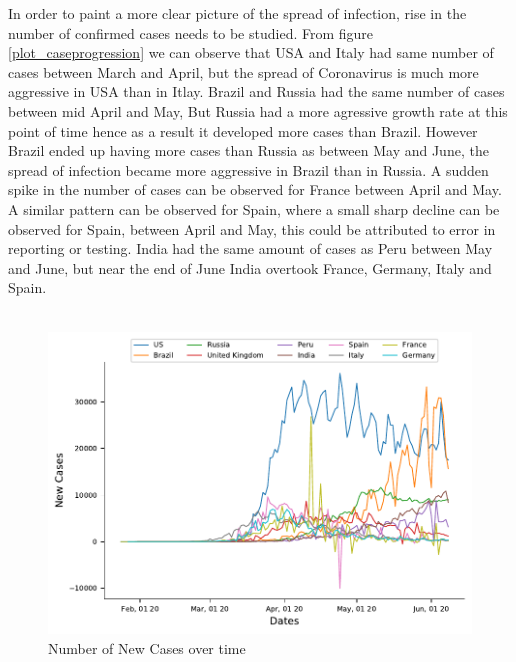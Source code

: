 \documentclass[12pt, twosided]{report}  %
\begin{document}
In order to paint a more clear picture of the spread of infection, rise in the number of confirmed cases needs to be studied. From figure \ref{plot_caseprogression} we can observe that USA and Italy had same number of cases between March and April, but the spread of Coronavirus is much more aggressive in USA than in Itlay. Brazil and Russia had the same number of cases between mid April and May, But Russia had a more agressive growth rate at this point of time hence as a result it developed more cases than Brazil. However Brazil ended up having more cases than Russia as between May and June, the spread of infection became more aggressive in Brazil than in Russia. A sudden spike in the number of cases can be observed for France between April and May. A similar pattern can be observed for Spain, where a small sharp decline can be observed  for Spain, between April and May, this could be attributed to error in reporting or testing. India had the same amount of cases as Peru between May and June, but near the end of June India overtook France, Germany, Italy and Spain.
\\
\\
\begin{figure}[H]
	\centering
	\includegraphics[width=0.5\linewidth]{./images/plot-4.pdf}
	\caption{Number of New Cases over time}
	\label{plot_newcases}
\end{figure}
\end{document}
